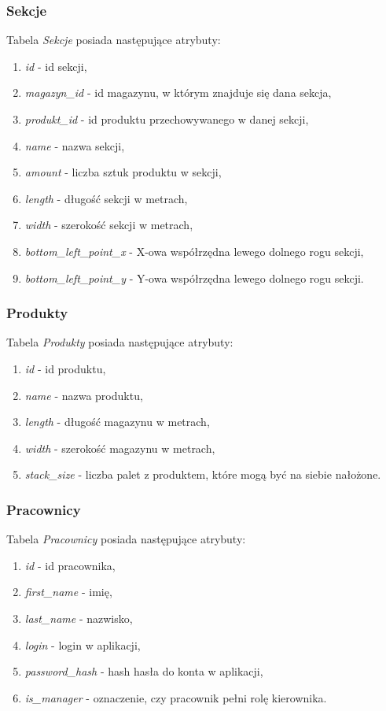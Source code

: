 \documentclass[]{article}
\begin{document}
    \subsubsection{Sekcje}
    Tabela \textit{Sekcje} posiada następujące atrybuty:
    \begin{enumerate}
        \item \textit{id} - id sekcji,
        \item \textit{magazyn\_id} - id magazynu, w którym znajduje się dana sekcja,
        \item \textit{produkt\_id} - id produktu przechowywanego w danej sekcji,
        \item \textit{name} - nazwa sekcji,
        \item \textit{amount} - liczba sztuk produktu w sekcji,
        \item \textit{length} - długość sekcji w metrach,
        \item \textit{width} - szerokość sekcji w metrach,
        \item \textit{bottom\_left\_point\_x} - X-owa współrzędna lewego dolnego rogu sekcji,
        \item \textit{bottom\_left\_point\_y} - Y-owa współrzędna lewego dolnego rogu sekcji.
    \end{enumerate}

    \subsubsection{Produkty}
    Tabela \textit{Produkty} posiada następujące atrybuty:
    \begin{enumerate}
        \item \textit{id} - id produktu,
        \item \textit{name} - nazwa produktu,
        \item \textit{length} - długość magazynu w metrach,
        \item \textit{width} - szerokość magazynu w metrach,
        \item \textit{stack\_size} - liczba palet z produktem, które mogą być na siebie nałożone.
    \end{enumerate}


    \subsubsection{Pracownicy}
    Tabela \textit{Pracownicy} posiada następujące atrybuty:
    \begin{enumerate}
        \item \textit{id} - id pracownika,
        \item \textit{first\_name} - imię,
        \item \textit{last\_name} - nazwisko,
        \item \textit{login} - login w aplikacji,
        \item \textit{password\_hash} - hash hasła do konta w aplikacji,
        \item \textit{is\_manager} - oznaczenie, czy pracownik pełni rolę kierownika.
    \end{enumerate}
\end{document}
